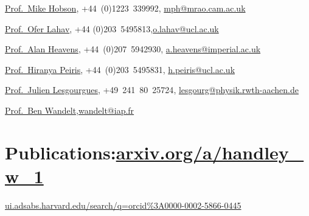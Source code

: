 \documentclass[11pt,a4paper,sans]{moderncv}
\begin{document}
\href{https://www.phy.cam.ac.uk/directory/hobsonm}{Prof.\ Mike Hobson}, {+44~(0)1223~339992}, \href{mailto:mph@mrao.cam.ac.uk}{mph@mrao.cam.ac.uk} 


\href{https://www.ucl.ac.uk/astrophysics/professor-ofer-lahav}{Prof.\ Ofer Lahav}, {+44 (0)203~5495813},\href{mailto:o.lahav@ucl.ac.uk}{o.lahav@ucl.ac.uk} 

\href{https://www.imperial.ac.uk/people/a.heavens}{Prof.\ Alan Heavens}, {+44~(0)207~5942930}, \href{mailto:a.heavens@imperial.ac.uk}{a.heavens@imperial.ac.uk} 


\href{https://www.ucl.ac.uk/cosmoparticle/hiranya-peiris}{Prof.\ Hiranya Peiris}, {+44~(0)203~5495831}, \href{mailto:h.peiris@ucl.ac.uk}{h.peiris@ucl.ac.uk} 

\href{https://www.particle-theory.rwth-aachen.de/go/id/gufe/lidx/1}{Prof.\ Julien Lesgourgues}, {+49~241~80~25724}, \href{mailto:lesgourg@physik.rwth-aachen.de}{lesgourg@physik.rwth-aachen.de} 

\href{https://benwandelt.org/}{Prof.\ Ben Wandelt},\href{mailto:wandelt@iap.fr}{wandelt@iap.fr} 

\pagebreak
\section{Publications:\hfill  \href{https://www.arxiv.org/a/handley_w_1.html}{arxiv.org/a/handley\_w\_1}}

\hfill \href{https://ui.adsabs.harvard.edu/search/q=orcid\%3A0000-0002-5866-0445}{ui.adsabs.harvard.edu/search/q=orcid\%3A0000-0002-5866-0445}

\vspace{-10pt}


\end{document}
